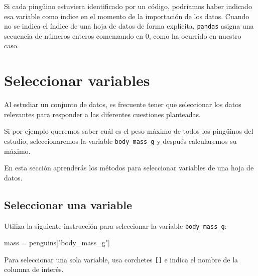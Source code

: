\documentclass[
  a4paper,
  noprof,
  12pt,
  notoc,
  nosols,
  nobib]{mnye}
\newenvironment{Shaded}{\begin{snugshade}}{\end{snugshade}}
\newcommand{\NormalTok}[1]{\textcolor[rgb]{0.00,0.23,0.31}{#1}}
\newcommand{\OperatorTok}[1]{\textcolor[rgb]{0.37,0.37,0.37}{#1}}
\newcommand{\StringTok}[1]{\textcolor[rgb]{0.13,0.47,0.30}{#1}}
\theoremstyle{definition}
\theoremstyle{remark}
\begin{document}
Si cada pingüino estuviera identificado por un código, podríamos haber
indicado esa variable como índice en el momento de la importación de los
datos. Cuando no se indica el índice de una hoja de datos de forma
explícita, \texttt{pandas} asigna una secuencia de números enteros
comenzando en 0, como ha ocurrido en nuestro caso.


\section{Seleccionar variables}\label{sec-subset-variables}

Al estudiar un conjunto de datos, es frecuente tener que seleccionar los
datos relevantes para responder a las diferentes cuestiones planteadas.

Si por ejemplo queremos saber cuál es el peso máximo de todos los
pingüinos del estudio, seleccionaremos la variable
\texttt{body\_mass\_g} y después calcularemos su máximo.

En esta sección aprenderás los métodos para seleccionar variables de una
hoja de datos.

\subsection{Seleccionar una variable}\label{sec-subset-one-variable}

Utiliza la siguiente instrucción para seleccionar la variable
\texttt{body\_mass\_g}:

\begin{Shaded}
\begin{Highlighting}[]
\NormalTok{mass }\OperatorTok{=}\NormalTok{ penguins[}\StringTok{"body\_mass\_g"}\NormalTok{]}
\end{Highlighting}
\end{Shaded}

\begin{tcolorbox}[enhanced jigsaw, bottomrule=.15mm, colframe=quarto-callout-note-color-frame, toprule=.15mm, leftrule=.75mm, breakable, left=2mm, arc=.35mm, rightrule=.15mm, colback=white, opacityback=0]
\begin{minipage}[t]{5.5mm}
\textcolor{quarto-callout-note-color}{\faInfo}
\end{minipage}%
\begin{minipage}[t]{\textwidth - 5.5mm}

Para seleccionar una sola variable, usa corchetes \texttt{{[}{]}} e
indica el nombre de la columna de interés.

\end{minipage}%
\end{tcolorbox}
\end{document}
